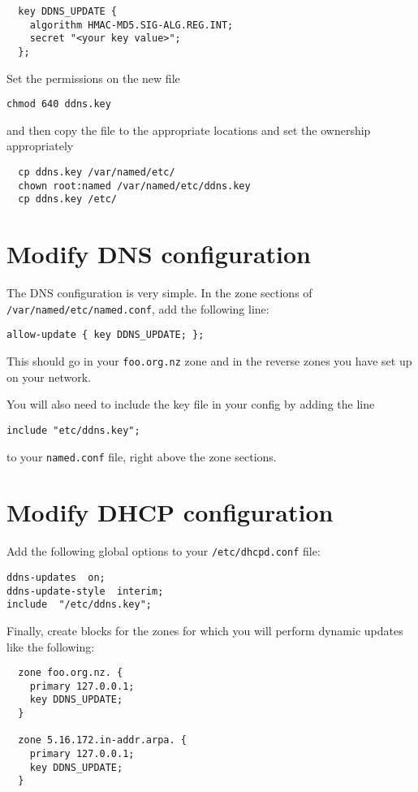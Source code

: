 \documentclass{article}
\begin{document}
\begin{verbatim}
  key DDNS_UPDATE {
    algorithm HMAC-MD5.SIG-ALG.REG.INT;
    secret "<your key value>";
  };
\end{verbatim}

Set the permissions on the new file

\texttt{chmod 640 ddns.key}

and then copy the file to the appropriate locations and set the ownership appropriately

\begin{verbatim}
  cp ddns.key /var/named/etc/
  chown root:named /var/named/etc/ddns.key
  cp ddns.key /etc/
\end{verbatim}

\section{Modify DNS configuration}
The DNS configuration is very simple.  In the zone sections of \texttt{/var/named/etc/named.conf}, add the following line:

\texttt{allow-update \{ key DDNS\_UPDATE; \};}

This should go in your \texttt{foo.org.nz} zone and in the reverse zones you have set up on your 
network.

You will also need to include the key file in your config by adding the line

\begin{verbatim}
include "etc/ddns.key";
\end{verbatim}

to your \texttt{named.conf} file, right above the zone sections.

\section{Modify DHCP configuration}
Add the following global options to your \texttt{/etc/dhcpd.conf} file:

\begin{verbatim}
ddns-updates  on;
ddns-update-style  interim;
include  "/etc/ddns.key";
\end{verbatim}

Finally, create blocks for the zones for which you will perform dynamic updates like the following:

\begin{verbatim}
  zone foo.org.nz. {
    primary 127.0.0.1;
    key DDNS_UPDATE;
  }

  zone 5.16.172.in-addr.arpa. {
    primary 127.0.0.1;
    key DDNS_UPDATE;
  }
\end{verbatim}
\end{document}
